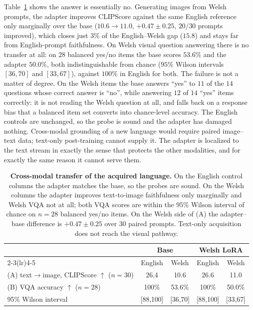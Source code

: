 \documentclass{article}
\begin{document}
Table~\ref{tab:xmodal} shows the answer is essentially no. Generating images from
Welsh prompts, the adapter improves CLIPScore against the same English reference
only marginally over the base ($10.6\to11.0$, $+0.47\pm0.25$, $20/30$ prompts
improved), which closes just $3\%$ of the English--Welsh gap ($15.8$) and stays
far from English-prompt faithfulness. On Welsh visual question answering there is
no transfer at all: on $28$ balanced yes/no items the base scores $53.6\%$ and
the adapter $50.0\%$, both indistinguishable from chance ($95\%$ Wilson intervals
$[36,70]$ and $[33,67]$), against $100\%$ in English for both. The failure is not
a matter of degree. On the Welsh items the base answers ``yes'' to $11$ of the
$14$ questions whose correct answer is ``no'', while answering $12$ of $14$
``yes'' items correctly: it is not reading the Welsh question at all, and falls
back on a response bias that a balanced item set converts into chance-level
accuracy. The English controls are unchanged, so the probe is sound and the
adapter has damaged nothing. Cross-modal grounding of a new language would
require paired image--text data; text-only post-training cannot supply it. The
adapter is localized to the text stream in exactly the sense that protects the
other modalities, and for exactly the same reason it cannot serve them.

\begin{table}[t]
\caption{\textbf{Cross-modal transfer of the acquired language.} On the English
control columns the adapter matches the base, so the probes are sound. On the
Welsh columns the adapter improves text-to-image faithfulness only marginally and
Welsh VQA not at all; both VQA scores are within the $95\%$ Wilson interval of
chance on $n{=}28$ balanced yes/no items. On the Welsh side of (A) the
adapter--base difference is $+0.47\pm0.25$ over $30$ paired prompts. Text-only
acquisition does not reach the visual pathway.}
\label{tab:xmodal}
\centering\small
\begin{tabular}{lcccc}
\toprule
& \multicolumn{2}{c}{Base} & \multicolumn{2}{c}{Welsh LoRA} \\
\cmidrule(lr){2-3}\cmidrule(lr){4-5}
& English & Welsh & English & Welsh \\
\midrule
(A) text$\to$image, CLIPScore $\uparrow$ ($n{=}30$) & 26.4 & 10.6 & 26.6 & 11.0 \\
(B) VQA accuracy $\uparrow$ ($n{=}28$)              & 100\% & 53.6\% & 100\% & 50.0\% \\
\quad\tiny 95\% Wilson interval & \tiny[88,100] & \tiny[36,70] & \tiny[88,100] & \tiny[33,67] \\
\bottomrule
\end{tabular}
\end{table}
\end{document}
